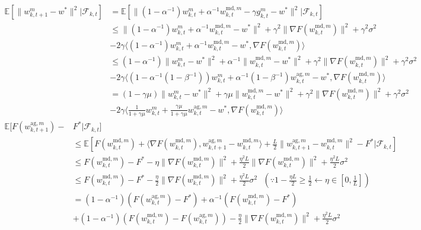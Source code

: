 \documentclass[11pt]{article}
\begin{document}
\begin{align*}
    \mathbb{E}[\|w_{k, t+1}^m-w^*\|^2|\mathcal{F}_{k, t}] &= \mathbb{E}[\|(1-\alpha^{-1})w_{k, t}^m + \alpha^{-1}w_{k, t}^{\textrm{md}, m} - \gamma g_{k, t}^m -w^*\|^2|\mathcal{F}_{k, t}] \\
    &\leq \|(1-\alpha^{-1})w_{k, t}^m + \alpha^{-1}w_{k, t}^{\textrm{md}, m} - w^*\|^2 + \gamma^2 \|\nabla F(w_{k, t}^{\textrm{md}, m})\|^2 + \gamma^2\sigma^2 \\
    &- 2\gamma \langle (1-\alpha^{-1})w_{k, t}^m + \alpha^{-1}w_{k, t}^{\textrm{md}, m} - w^*, \nabla F(w_{k, t}^{\textrm{md}, m})\rangle \\
    &\leq (1-\alpha^{-1})\|w_{k, t}^m -w^*\|^2 + \alpha^{-1}\|w_{k, t}^{\textrm{md}, m}-w^*\|^2+ \gamma^2 \|\nabla F(w_{k, t}^{\textrm{md}, m})\|^2 + \gamma^2\sigma^2 \\
    &- 2\gamma \langle (1-\alpha^{-1}(1-\beta^{-1}))w_{k, t}^m + \alpha^{-1}(1-\beta^{-1})w_{k, t}^{\textrm{ag}, m} - w^*, \nabla F(w_{k, t}^{\textrm{md}, m})\rangle \\
    &= (1-\gamma\mu)\|w_{k, t}^m -w^*\|^2 + \gamma\mu\|w_{k, t}^{\textrm{md}, m}-w^*\|^2+ \gamma^2 \|\nabla F(w_{k, t}^{\textrm{md}, m})\|^2 + \gamma^2\sigma^2 \\
    &- 2\gamma \langle \frac{1}{1+\gamma\mu}w_{k, t}^m + \frac{\gamma\mu}{1+\gamma\mu}w_{k, t}^{\textrm{ag}, m} - w^*, \nabla F(w_{k, t}^{\textrm{md}, m})\rangle
\end{align*}
\begin{align*}
    \mathbb{E}[F(w_{k, t+1}^{\textrm{ag}, m}) - &F^* |\mathcal{F}_{k, t}] \\
    &\leq \mathbb{E}[F(w_{k, t}^{\textrm{md}, m}) + \langle \nabla F(w_{k, t}^{\textrm{md}, m}), w_{k, t+1}^{\textrm{ag}, m} - w_{k, t}^{\textrm{md}, m} \rangle + \frac{L}{2}\|w_{k, t+1}^{\textrm{ag}, m} - w_{k, t}^{\textrm{md}, m}\|^2 - F^*|\mathcal{F}_{k, t}] \\
    &\leq F(w_{k, t}^{\textrm{md}, m}) -F^* - \eta\|\nabla F(w_{k, t}^{\textrm{md}, m})\|^2 + \frac{\eta^2 L}{2}\|\nabla F(w_{k, t}^{\textrm{md}, m})\|^2 + \frac{\eta^2 L}{2}\sigma^2 \\
    &\leq F(w_{k, t}^{\textrm{md}, m}) -F^* - \frac{\eta}{2}\|\nabla F(w_{k, t}^{\textrm{md}, m})\|^2 + \frac{\eta^2 L}{2}\sigma^2 \textrm{ }(\because 1-\frac{\eta L}{2} \geq \frac{1}{2} \leftarrow \eta \in [0, \frac{1}{L}]) \\
    &= (1-\alpha^{-1})(F(w_{k, t}^{\textrm{ag}, m})-F^*) + \alpha^{-1}(F(w_{k, t}^{\textrm{md}, m}) -F^*) \\
    &+ (1-\alpha^{-1})(F(w_{k, t}^{\textrm{md}, m}) - F(w_{k, t}^{\textrm{ag}, m})) - \frac{\eta}{2}\|\nabla F(w_{k, t}^{\textrm{md}, m})\|^2 + \frac{\eta^2 L}{2}\sigma^2
\end{align*}
\end{document}
